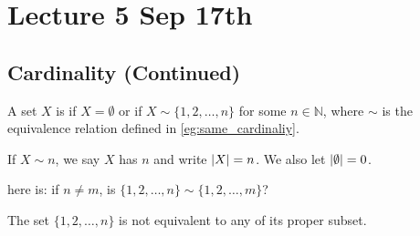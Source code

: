 \documentclass[notoc,notitlepage]{tufte-book}
\begin{document}

\chapter{Lecture 5 Sep 17th}%
\label{chp:lecture_5_sep_17th}

\section{Cardinality (Continued)}%
\label{sec:cardinality_continued}

\begin{defn}\label{defn:finite_sets}
  A set $X$ is  if $X = \emptyset$ or if $X \sim \{ 1, 2, \ldots, n \}$ for some $n \in \mathbb{N}$, where $\sim$ is the equivalence relation defined in \cref{eg:same_cardinaliy}.
\end{defn}

\begin{defn}[Cardinality]\label{defn:cardinality}
  If $X \sim n$, we say $X$ has  $n$ and write $\left|X\right| = n$. We also let $\left|\emptyset\right| = 0$.
\end{defn}

 here is: if $n \neq m$, is $\{1, 2, \ldots, n \} \sim \{ 1, 2, \ldots, m \}$?

\begin{thm}\label{thm:pigeonhole_principle}
  The set $\{1, 2, \ldots, n\}$ is not equivalent to any of its proper subset.
\end{thm}
\end{document}
